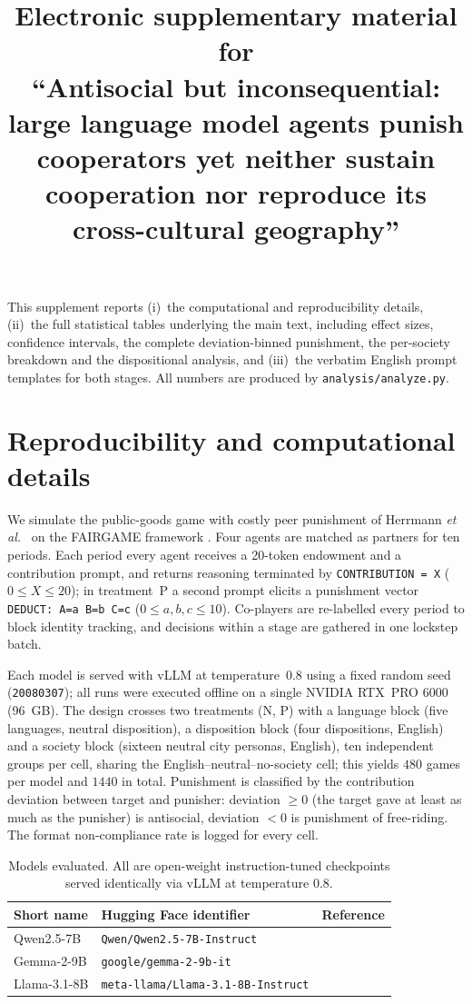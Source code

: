\documentclass[11pt]{article}
\title{Electronic supplementary material for\\[2pt]
\large ``Antisocial but inconsequential: large language model agents punish
cooperators yet neither sustain cooperation nor reproduce its cross-cultural
geography''}
\author{}
\date{}
\begin{document}
\maketitle

This supplement reports (i)~the computational and reproducibility details, (ii)~the
full statistical tables underlying the main text, including effect sizes,
confidence intervals, the complete deviation-binned punishment, the per-society
breakdown and the dispositional analysis, and (iii)~the verbatim English prompt
templates for both stages. All numbers are produced by \texttt{analysis/analyze.py}.

\section{Reproducibility and computational details}

We simulate the public-goods game with costly peer punishment of Herrmann
\textit{et al.}\ \cite{herrmann2008antisocial} on the FAIRGAME framework
\cite{fairgame2025}. Four agents are matched as partners for ten periods. Each
period every agent receives a 20-token endowment and a contribution prompt, and
returns reasoning terminated by \texttt{CONTRIBUTION = X} ($0\le X\le20$); in
treatment~P a second prompt elicits a punishment vector \texttt{DEDUCT: A=a B=b
C=c} ($0\le a,b,c\le10$). Co-players are re-labelled every period to block
identity tracking, and decisions within a stage are gathered in one lockstep
batch.

Each model is served with vLLM at temperature~$0.8$ using a fixed random seed
(\texttt{20080307}); all runs were executed offline on a single NVIDIA RTX~PRO
6000 (96~GB). The design crosses two treatments (N, P) with a language block
(five languages, neutral disposition), a disposition block (four dispositions,
English) and a society block (sixteen neutral city personas, English), ten
independent groups per cell, sharing the English--neutral--no-society cell; this
yields $480$ games per model and $1440$ in total. Punishment is classified by the
contribution deviation between target and punisher: deviation $\geq 0$ (the target
gave at least as much as the punisher) is antisocial, deviation $<0$ is punishment
of free-riding. The format non-compliance rate is logged for every cell.

\begin{table}[h]\centering
\caption{Models evaluated. All are open-weight instruction-tuned checkpoints
served identically via vLLM at temperature $0.8$.}
\label{tab:si_models}
\begin{tabular}{lll}
\toprule
Short name & Hugging Face identifier & Reference \\
\midrule
Qwen2.5-7B   & \texttt{Qwen/Qwen2.5-7B-Instruct}       & \cite{qwen2025} \\
Gemma-2-9B   & \texttt{google/gemma-2-9b-it}           & \cite{gemma2024} \\
Llama-3.1-8B & \texttt{meta-llama/Llama-3.1-8B-Instruct}& \cite{llama2024} \\
\bottomrule
\end{tabular}
\end{table}
\end{document}
